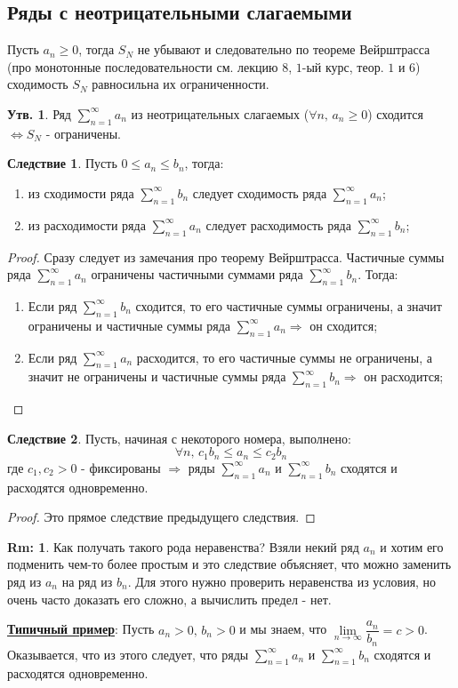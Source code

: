 \documentclass[12pt]{article}
\theoremstyle{definition}
\newtheorem{rem}{Rm:}
\newtheorem{prop}{Утв.}
\newtheorem{corollary}{Следствие}
\newcommand{\ssum}[1]{\displaystyle \sum\limits_{n=1}^{\infty}{#1}_n}
\begin{document}
\subsection*{Ряды с неотрицательными слагаемыми}
Пусть $a_n \geq 0$, тогда $S_N$ не убывают и следовательно по теореме Вейрштрасса (про монотонные последовательности см. лекцию $8$, $1$-ый курс, теор. $1$ и $6$) сходимость $S_N$ равносильна их ограниченности.
\begin{prop}
	Ряд $\ssum{a}$ из неотрицательных слагаемых ($\forall n, \, a_n \geq 0$) сходится $\Leftrightarrow S_N$ - ограничены.
\end{prop}
\begin{corollary}
	Пусть $0 \leq a_n \leq b_n$, тогда:
	\begin{enumerate}[label ={(\arabic*)}]
		\item из сходимости ряда $\ssum{b}$ следует сходимость ряда $\ssum{a}$;
		\item из расходимости ряда $\ssum{a}$ следует расходимость ряда $\ssum{b}$;
	\end{enumerate} 
\end{corollary} 
\begin{proof}
	Сразу следует из замечания про теорему Вейрштрасса. Частичные суммы ряда $\ssum{a}$ ограничены частичными суммами ряда $\ssum{b}$. Тогда:
	\begin{enumerate}[label ={(\arabic*)}]
		\item Если ряд $\ssum{b}$ сходится, то его частичные суммы ограничены, а значит ограничены и частичные суммы ряда $\ssum{a} \Rightarrow$ он сходится;
		\item Если ряд $\ssum{a}$ расходится, то его частичные суммы не ограничены, а значит не ограничены и частичные суммы ряда $\ssum{b} \Rightarrow$ он расходится;
	\end{enumerate}
\end{proof}
\begin{corollary}
	Пусть, начиная с некоторого номера, выполнено: 
	$$
		\forall n, \, c_1 b_n \leq a_n \leq c_2 b_n
	$$
	где $c_1, c_2 >0$ - фиксированы $\Rightarrow$ ряды $\ssum{a}$ и $\ssum{b}$ сходятся и расходятся одновременно.
\end{corollary}
\begin{proof}
	Это прямое следствие предыдущего следствия.
\end{proof}
\begin{rem}
	Как получать такого рода неравенства? Взяли некий ряд $a_n$ и хотим его подменить чем-то более простым и это следствие объясняет, что можно заменить ряд из $a_n$ на ряд из $b_n$. Для этого нужно проверить неравенства из условия, но очень часто доказать его сложно, а вычислить предел - нет. 
\end{rem}
\uline{\textbf{Типичный пример}}: Пусть $a_n > 0, \, b_n > 0$ и мы знаем, что $\lim\limits_{n \to \infty}\dfrac{a_n}{b_n} = c > 0$. Оказывается, что из этого следует, что ряды $\ssum{a}$ и $\ssum{b}$ сходятся и расходятся одновременно.
\end{document}
